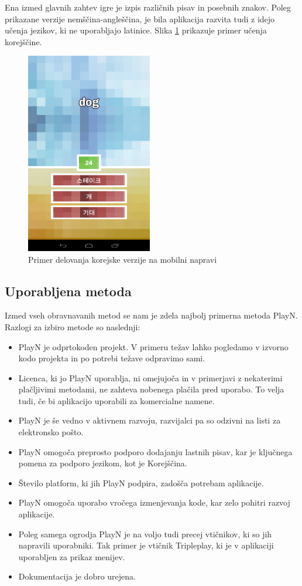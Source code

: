 Ena izmed glavnih zahtev igre je izpis različnih pisav in posebnih znakov. Poleg prikazane verzije nemščina-angleščina, je bila aplikacija razvita tudi z idejo učenja jezikov, ki ne uporabljajo latinice. Slika \ref{korean} prikazuje primer učenja korejščine. 

\begin{figure}
\begin{center}
\includegraphics[width=5.5cm]{pic/defg-korean.png}
\end{center}
\caption{Primer delovanja korejske verzije na mobilni napravi}
\label{korean}
\end{figure} 

\subsection{Uporabljena metoda}

Izmed vseh obravnavanih metod se nam je zdela najbolj primerna metoda PlayN. Razlogi za izbiro metode so naslednji:

\begin{itemize}
\item PlayN je odprtokoden projekt. V primeru težav lahko pogledamo v izvorno kodo projekta in po potrebi težave odpravimo sami.
\item Licenca, ki jo PlayN uporablja, ni omejujoča in v primerjavi z nekaterimi plačljivimi metodami, ne zahteva nobenega plačila pred uporabo. To velja tudi, če bi aplikacijo uporabili za komercialne namene.
\item PlayN je še vedno v aktivnem razvoju, razvijalci pa so odzivni na listi za elektronsko pošto.
\item PlayN omogoča preprosto podporo dodajanju lastnih pisav, kar je ključnega pomena za podporo jezikom, kot je Korejščina.
\item Število platform, ki jih PlayN podpira, zadošča potrebam aplikacije.
\item PlayN omogoča uporabo vročega izmenjevanja kode, kar zelo pohitri razvoj aplikacije.
\item Poleg samega ogrodja PlayN je na voljo tudi precej vtičnikov, ki so jih napravili uporabniki. Tak primer je vtičnik Tripleplay, ki je v aplikaciji uporabljen za prikaz menijev.
\item Dokumentacija je dobro urejena.
\end{itemize}

